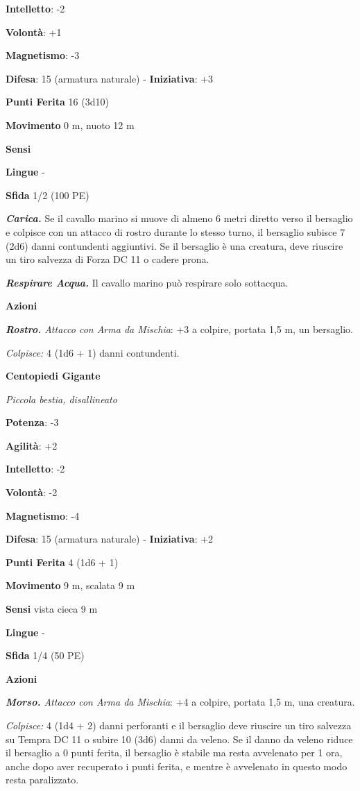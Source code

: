 \begin{multicols}{2}
\textbf{Intelletto}: -2

\textbf{Volontà}: +1

\textbf{Magnetismo}: -3

\textbf{Difesa}: 15 (armatura naturale) - \textbf{Iniziativa}: +3

\textbf{Punti Ferita} 16 (3d10)

\textbf{Movimento} 0 m, nuoto 12 m

\textbf{Sensi} 

\textbf{Lingue} -

\textbf{Sfida} 1/2 (100 PE)

\emph{\textbf{Carica.}} Se il cavallo marino si muove di almeno 6 metri
diretto verso il bersaglio e colpisce con un attacco di rostro durante
lo stesso turno, il bersaglio subisce 7 (2d6) danni contundenti
aggiuntivi. Se il bersaglio è una creatura, deve riuscire un tiro
salvezza di Forza DC 11 o cadere prona.

\emph{\textbf{Respirare Acqua.}} Il cavallo marino può respirare solo
sottacqua.

\textbf{Azioni}

\emph{\textbf{Rostro.} Attacco con Arma da Mischia}: +3 a colpire,
portata 1,5 m, un bersaglio.

\emph{Colpisce:} 4 (1d6 + 1) danni contundenti.

\textbf{Centopiedi Gigante}

\emph{Piccola bestia, disallineato}

\textbf{Potenza}: -3

\textbf{Agilità}: +2

\textbf{Intelletto}: -2

\textbf{Volontà}: -2

\textbf{Magnetismo}: -4

\textbf{Difesa}: 15 (armatura naturale) - \textbf{Iniziativa}: +2

\textbf{Punti Ferita} 4 (1d6 + 1)

\textbf{Movimento} 9 m, scalata 9 m

\textbf{Sensi} vista cieca 9 m

\textbf{Lingue} -

\textbf{Sfida} 1/4 (50 PE)

\textbf{Azioni}

\emph{\textbf{Morso.} Attacco con Arma da Mischia}: +4 a colpire,
portata 1,5 m, una creatura.

\emph{Colpisce:} 4 (1d4 + 2) danni perforanti e il bersaglio deve
riuscire un tiro salvezza su Tempra DC 11 o subire 10 (3d6) danni
da veleno. Se il danno da veleno riduce il bersaglio a 0 punti ferita,
il bersaglio è stabile ma resta avvelenato per 1 ora, anche dopo aver
recuperato i punti ferita, e mentre è avvelenato in questo modo resta
paralizzato.


\end{multicols}
